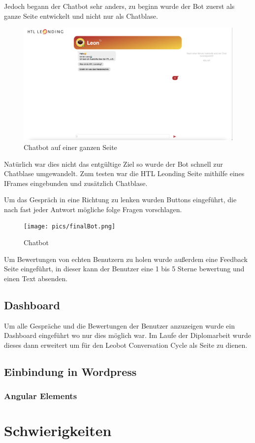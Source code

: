 Jedoch begann der Chatbot sehr anders, zu beginn wurde der Bot zuerst als ganze Seite entwickelt und nicht nur als Chatblase.
\begin{figure}[hbt!]
    \centering
    \includegraphics[scale=0.2]{pics/fullPageBot.png}
    \caption{Chatbot auf einer ganzen Seite}
    \label{fig:impl:conceptBotOpen}
\end{figure}

Natürlich war dies nicht das entgültige Ziel so wurde der Bot schnell zur Chatblase umgewandelt.
Zum testen war die HTL Leonding Seite mithilfe eines IFrames eingebunden und zusätzlich Chatblase.

Um das Gespräch in eine Richtung zu lenken wurden Buttons eingeführt, die nach fast jeder Antwort mögliche folge Fragen vorschlagen.

\begin{figure}[hbt!]
    \centering
    \texttt{[image: pics/finalBot.png]}
    \caption{Chatbot}
    \label{fig:impl:bot}
\end{figure}

Um Bewertungen von echten Benutzern zu holen wurde außerdem eine Feedback Seite eingeführt, in dieser kann der Benutzer eine 1 bis 5 Sterne bewertung und einen Text absenden.


\subsection{Dashboard}

Um alle Gespräche und die Bewertungen der Benutzer anzuzeigen wurde ein Dashboard eingeführt wo nur dies möglich war.
Im Laufe der Diplomarbeit wurde dieses dann erweitert um für den Leobot Conversation Cycle als Seite zu dienen.


\subsection{Einbindung in Wordpress}
\subsubsection{Angular Elements}

\section{Schwierigkeiten}
